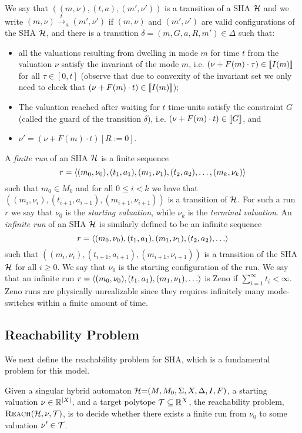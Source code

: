  We say that $((m, \nu), (t, a), (m', \nu'))$ is a transition of a SHA $\mathcal{H}$
 and we write $(m, \nu) \xrightarrow{t}_{a} (m', \nu')$ 
 if $(m, \nu)$ and $(m', \nu')$ are valid configurations of the SHA $\mathcal{H}$, and
 there is a transition  $\delta = (m, G, a, R, m') \in \Delta$ such that: 
 \begin{itemize}
 \item  
   all the valuations resulting from dwelling in mode $m$ for time $t$ from the
   valuation $\nu$ satisfy the invariant of the mode $m$, i.e. 
   $(\nu + F(m) \cdot \tau) \in [ \! [ {I(m)} ] \! ]$ for all $\tau \in [0, t]$ 
   (observe that due to convexity of the invariant set we only need to check
   that  $(\nu + F(m) \cdot t) \in  [ \! [ {I(m)} ] \! ]$); 
 \item
   The valuation reached after waiting for $t$ time-units satisfy the
   constraint $G$ (called the  guard of the transition $\delta$), i.e. 
   $(\nu + F(m) \cdot t) \in [ \! [ {G} ] \! ]$, and
 \item
   $\nu' = (\nu + F(m)\cdot t)[R:=0]$. 
 \end{itemize}

 A \emph{finite run} of an SHA $\mathcal{H}$ is a finite sequence 
 \[
 r = \langle (m_0, \nu_0), (t_1, a_1), (m_1, \nu_1), (t_2, a_2), \ldots, (m_k, \nu_k) \rangle
 \] 
 such that $m_0 \in M_0$ and for all $0 \leq i < k$ we have
 that $((m_i, \nu_i), (t_{i+1}, a_{i+1}), (m_{i+1}, \nu_{i+1}))$ is a transition
 of $\mathcal{H}$.
 For such a run $r$ we say that $\nu_0$ is the \emph{starting valuation}, while
 $\nu_k$ is the \emph{terminal valuation}. 
 An \emph{infinite run} of an SHA $\mathcal{H}$ is similarly defined to be an infinite
 sequence 
 \[
 r = \langle (m_0, \nu_0), (t_1, a_1), (m_1, \nu_1), (t_2, a_2), \ldots \rangle
 \] 
 such that $((m_i, \nu_i), (t_{i+1}, a_{i+1}), (m_{i+1}, \nu_{i+1}))$ is a
 transition of the SHA $\mathcal{H}$ for all $i \geq 0$.
 We say that $\nu_0$ is the starting configuration of the run. 
 We say that an infinite run $r = \langle (m_0, \nu_0), (t_1, a_1), (m_1, \nu_1),
   \ldots \rangle$  is Zeno if $\sum_{i=1}^{\infty} t_i < \infty$. 
 Zeno runs are physically unrealizable since they requires infinitely many
 mode-switches within a finite amount of time.

\subsection{Reachability Problem} 
 We next define the reachability problem for SHA, which is a fundamental problem
 for this model.

 \begin{definition} Given a singular hybrid automaton
   $\mathcal{H}{=} (M, M_0, \Sigma, X, \Delta, I, F)$, a starting valuation $\nu \in
   \mathbb R^{|X|}$, and a target polytope $\mathcal{T} \subseteq \mathbb R^{X}$, the
   reachability problem, $\textsc{Reach}(\mathcal{H}, \nu,\mathcal{T})$, is to decide whether there
   exists a finite run from $\nu_0$ to some valuation $\nu' \in \mathcal{T}$. 
 \end{definition}

